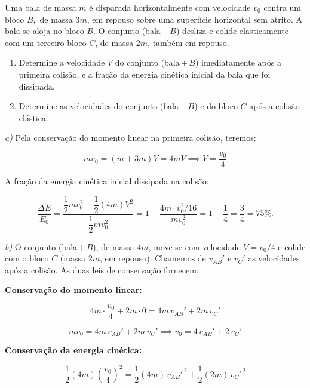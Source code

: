 \begin{exemplo}\label{exemplo_energia_ecineticaex03}

Uma bala de massa $m$ é disparada horizontalmente com velocidade
$v_0$ contra um bloco $B,$ de massa $3m$, em repouso sobre uma
superfície horizontal sem atrito. A bala se aloja no bloco $B$.
O conjunto (bala\,+\,$B$) desliza e colide elasticamente com um
terceiro bloco $C$, de massa $2m$, também em repouso.

\begin{enumerate}
    \item [a)]Determine a velocidade $V$ do conjunto (bala\,+\,$B$)
    imediatamente após a primeira colisão, e a fração da energia
    cinética inicial da bala que foi dissipada.

    \item [b)] Determine as velocidades do conjunto (bala\,+\,$B$) e
    do bloco $C$ após a colisão elástica.


\end{enumerate}

\resolucao

\noindent\textit{a)} Pela conservação do momento linear na primeira colisão, teremos:

\[
    mv_0 = (m + 3m)V = 4mV
    \implies
    \boxed{V = \frac{v_0}{4}}
\]

\noindent A fração da energia cinética inicial dissipada na colisão:

\[
    \frac{\Delta E}{E_0}
    = \frac{\dfrac{1}{2}mv_0^2 - \dfrac{1}{2}(4m)V^2}{\dfrac{1}{2}mv_0^2}
    = 1 - \frac{4m \cdot v_0^2/16}{mv_0^2}
    = 1 - \frac{1}{4}
    = \boxed{\frac{3}{4} = 75\%.}
\]


\medskip
\noindent\textit{b)} O conjunto (bala\,+\,$B$), de massa $4m$, move-se com
velocidade $V = v_0/4$ e colide com o bloco $C$ (massa $2m$, em
repouso). Chamemos de $v_{AB}'$ e $v_C'$ as velocidades após
a colisão. As duas leis de conservação fornecem:

\medskip
\noindent\textbf{Conservação do momento linear:}

\[
    4m\cdot\frac{v_0}{4} + 2m\cdot 0
    = 4m\,v_{AB}' + 2m\,v_C'
\]

\[
    mv_0 = 4m\,v_{AB}' + 2m\,v_C'
    \implies
    v_0 = 4\,v_{AB}' + 2\,v_C'
    \tag{I}
\]

\noindent\textbf{Conservação da energia cinética:}

\[
    \frac{1}{2}(4m)\left(\frac{v_0}{4}\right)^{\!2}
    =
    \frac{1}{2}(4m)\,v_{AB}'^{\,2} + \frac{1}{2}(2m)\,v_C'^{\,2}
\]


\end{exemplo}
